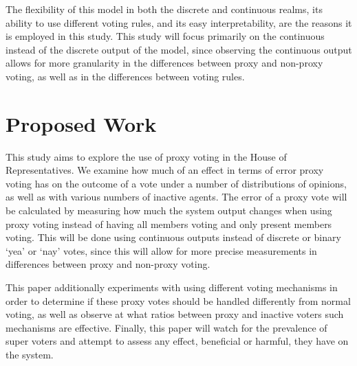 The flexibility of this model in both the discrete and continuous realms, its ability
to use different voting rules, and its easy interpretability, are the reasons it is
employed in this study.
This study will focus primarily on the continuous instead of the discrete output of
the model, since observing the continuous output allows for more granularity in the
differences between proxy and non-proxy voting, as well as in the differences between
voting rules.


\section{Proposed Work}\label{sec:contribution}
This study aims to explore the use of proxy voting in the House of Representatives.
We examine how much of an effect in terms of error proxy voting has on the outcome
of a vote under a number of distributions of opinions, as well as with various
numbers of inactive agents.
The error of a proxy vote will be calculated by measuring how much the system output
changes when using proxy voting instead of having all members voting and only present
members voting.
This will be done using continuous outputs instead of discrete or binary `yea' or
`nay' votes, since this will allow for more precise measurements in differences
between proxy and non-proxy voting.

This paper additionally experiments with using different voting mechanisms in order
to determine if these proxy votes should be handled differently from normal voting,
as well as observe at what ratios between proxy and inactive voters such mechanisms
are effective.
Finally, this paper will watch for the prevalence of super voters and attempt to
assess any effect, beneficial or harmful, they have on the system.


